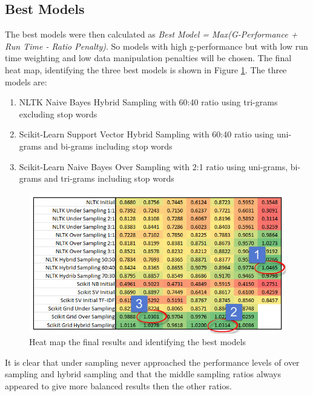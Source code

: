 \subsection{Best Models}
The best models were then calculated as \textit{Best Model = Max(G-Performance + Run Time - Ratio Penalty)}. So models with high g-performance but with low run time weighting and low data manipulation penalties will be chosen. The final heat map, identifying the three best models is shown in Figure \ref{fig:best_model_04}. The three models are:

\begin{enumerate}

	\item NLTK Naive Bayes Hybrid Sampling with 60:40 ratio using tri-grams excluding stop words
	\item Scikit-Learn Support Vector Hybrid Sampling with 60:40 ratio using uni-grams and bi-grams including stop words
	\item Scikit-Learn Naive Bayes Over Sampling with 2:1 ratio using uni-grams, bi-grams and tri-grams including stop words

\end{enumerate}

\begin{figure}[htbp]
	\centering
	\includegraphics[width=1\textwidth]{Figures/Chapter5/best_model_04.jpg}
	\caption[Best Model - Three best models identified]{Heat map the final results and identifying the best models}
	\label{fig:best_model_04}
\end{figure}

It is clear that under sampling never approached the performance levels of over sampling and hybrid sampling and that the middle sampling ratios always appeared to give more balanced results then the other ratios.

